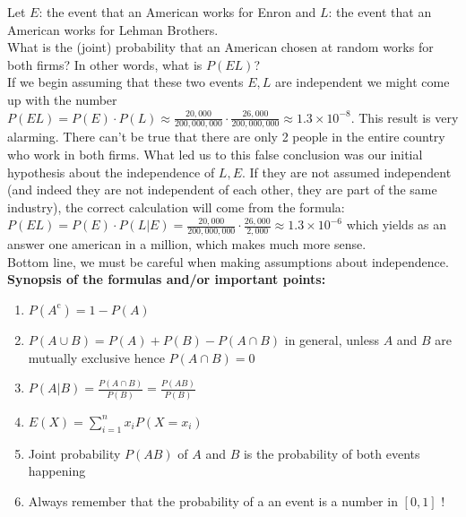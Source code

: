 \documentclass[12pt]{amsart}
\begin{document}
Let $E$: the event that an American works for Enron and $L$: the event that an American works for Lehman Brothers.\\
What is the (joint) probability that an American chosen at random works for both firms? In other words, what is $P(EL)$?\\
If we begin assuming that these two events $E,L$ are independent we might come up with the number $P(EL)=P(E)\cdot P(L)\approx\frac{20,000}{200,000,000}\cdot\frac{26,000}{200,000,000}\approx 1.3\times 10^{-8}$. This result is very alarming. There can't be true that there are only 2 people in the entire country who work in both firms. What led us to this false conclusion was our initial hypothesis about the independence of $L,E$. If they are not assumed independent (and indeed they are not independent of each other, they are part of the same industry), the correct calculation will come from the formula: \\
$P(EL)=P(E)\cdot P(L|E)=\frac{20,000}{200,000,000}\cdot \frac{26,000}{2,000}\approx 1.3\times 10^{-6}$ which yields as an answer one american in a million, which makes much more sense. \\

Bottom line, we must be careful when making assumptions about independence. \\

{\bf Synopsis of the formulas and/or important points:}\\

\begin{enumerate}
\item  $P(A^{\mathrm{c}})=1-P(A)$\\
\item $P(A\cup B)=P(A)+P(B)-P(A\cap B)$ in general, unless $A$ and $B$ are mutually exclusive hence $P(A\cap B)=0$\\
\item $P(A|B)=\displaystyle\frac{P(A\cap B)}{P(B)}=\displaystyle\frac{P(AB)}{P(B)}$\\
\item $E(X)=\displaystyle{\sum_{i=1}^nx_iP(X=x_i)}$\\
\item Joint probability $P(AB)$ of $A$ and $B$ is the probability of both events happening\\
\item Always remember that the probability of a an event is a number in $[0,1]$ !\\
\end{enumerate}
\end{document}
